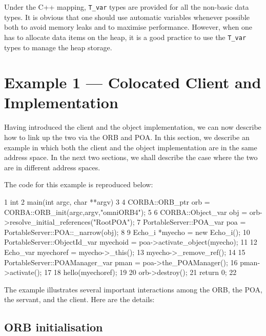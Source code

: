 \documentclass[11pt,twoside,a4paper]{book}
\newcommand{\type}[1]{\texttt{#1}}
\begin{document}
Under the C++ mapping, \type{T\_var} types are provided for all the
non-basic data types.  It is obvious that one should use automatic
variables whenever possible both to avoid memory leaks and to maximise
performance. However, when one has to allocate data items on the heap,
it is a good practice to use the \type{T\_var} types to manage the
heap storage.

\section{Example 1 --- Colocated Client and Implementation}
\label{objeg1}

Having introduced the client and the object implementation, we can now
describe how to link up the two via the ORB and POA. In this section,
we describe an example in which both the client and the object
implementation are in the same address space. In the next two
sections, we shall describe the case where the two are in different
address spaces.

The code for this example is reproduced below:


\lstset{stepnumber=1,gobble=4}
\begin{cxxlisting}
 1  int
 2  main(int argc, char **argv)
 3  {
 4    CORBA::ORB_ptr orb = CORBA::ORB_init(argc,argv,"omniORB4");
 5
 6    CORBA::Object_var       obj = orb->resolve_initial_references("RootPOA");
 7    PortableServer::POA_var poa = PortableServer::POA::_narrow(obj);
 8
 9    Echo_i *myecho = new Echo_i();
10    PortableServer::ObjectId_var myechoid = poa->activate_object(myecho);
11
12    Echo_var myechoref = myecho->_this();
13    myecho->_remove_ref();
14
15    PortableServer::POAManager_var pman = poa->the_POAManager();
16    pman->activate();
17
18    hello(myechoref);
19
20    orb->destroy();
21    return 0;
22  }
\end{cxxlisting}
\lstset{stepnumber=0,gobble=0}

The example illustrates several important interactions among the ORB,
the POA, the servant, and the client. Here are the details:

\subsection{ORB initialisation}
\end{document}
